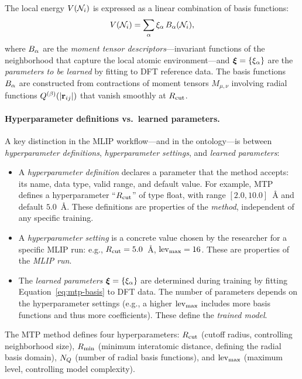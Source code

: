 The local energy $V(\mathcal{N}_{i})$ is expressed as a linear
combination of basis functions:
%
\begin{equation}\label{eq:mtp-basis}
  V(\mathcal{N}_{i}) = \sum_{\alpha} \xi_\alpha \, B_\alpha(\mathcal{N}_{i}),
\end{equation}
%
where $B_\alpha$ are the \emph{moment tensor
descriptors}---invariant functions of the neighborhood that capture the
local atomic environment---and $\boldsymbol{\xi} = \{\xi_\alpha\}$ are the
\emph{parameters to be learned} by fitting to DFT reference data. The
basis functions $B_\alpha$ are constructed from contractions of
moment tensors $M_{\mu,\nu}$ involving radial functions
$Q^{(\beta)}(|\mathbf{r}_{ij}|)$ that vanish smoothly at
$R_{\mathrm{cut}}$.

\paragraph{Hyperparameter definitions vs.\ learned parameters.}
A key distinction in the MLIP workflow---and in the ontology---is between
\emph{hyperparameter definitions}, \emph{hyperparameter settings}, and
\emph{learned parameters}:
%
\begin{itemize}
\item A \emph{hyperparameter definition} declares a parameter that the
  method accepts: its name, data type, valid range, and default value.
  For example, MTP defines a hyperparameter ``$R_{\mathrm{cut}}$'' of type float,
  with range $[2.0, 10.0]$~\AA{} and default $5.0$~\AA{}. These
  definitions are properties of the \emph{method}, independent of any
  specific training.
\item A \emph{hyperparameter setting} is a concrete value chosen by the
  researcher for a specific MLIP run: e.g., $R_{\mathrm{cut}} = 5.0$~\AA{},
  $\operatorname{lev}_{\mathrm{max}} = 16$. These are properties of the \emph{MLIP run}.
\item The \emph{learned parameters} $\boldsymbol{\xi} = \{\xi_\alpha\}$ are
  determined during training by fitting
  Equation~\eqref{eq:mtp-basis} to DFT data. The number of parameters
  depends on the hyperparameter settings (e.g., a higher $\operatorname{lev}_{\mathrm{max}}$
  includes more basis functions and thus more coefficients). These
  define the \emph{trained model}.
\end{itemize}
%
The MTP method defines four hyperparameters:
$R_{\mathrm{cut}}$ (cutoff radius, controlling neighborhood size),
$R_{\mathrm{min}}$ (minimum interatomic distance, defining the radial basis domain),
$N_Q$ (number of radial basis functions), and
$\operatorname{lev}_{\mathrm{max}}$ (maximum level, controlling model complexity).

